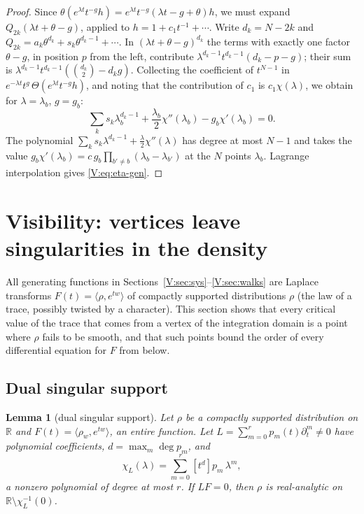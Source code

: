 \documentclass[11pt,a4paper]{article}
\newtheorem{lemma}[theorem]{Lemma}
\theoremstyle{definition}
\theoremstyle{remark}
\newcommand{\R}{\mathbb R}
\numberwithin{equation}{section}
\begin{document}
\begin{proof}
Since $\theta(e^{\lambda t}t^{-g}h)=e^{\lambda t}t^{-g}(\lambda t-g+\theta)h$, we must expand $Q_{2k}(\lambda t+\theta-g)$, applied to $h=1+c_1t^{-1}+\cdots$. Write $d_k=N-2k$ and $Q_{2k}=a_k\theta^{d_k}+s_k\theta^{d_k-1}+\cdots$. In $(\lambda t+\theta-g)^{d_k}$ the terms with exactly one factor $\theta-g$, in position $p$ from the left, contribute $\lambda^{d_k-1}t^{d_k-1}(d_k-p-g)$; their sum is $\lambda^{d_k-1}t^{d_k-1}(\binom{d_k}2-d_kg)$. Collecting the coefficient of $t^{N-1}$ in $e^{-\lambda t}t^{g}\,\Theta(e^{\lambda t}t^{-g}h)$, and noting that the contribution of $c_1$ is $c_1\chi(\lambda)$, we obtain for $\lambda=\lambda_b$, $g=g_b$:
\[
\sum_ks_k\lambda_b^{d_k-1}+\frac{\lambda_b}2\chi''(\lambda_b)-g_b\chi'(\lambda_b)=0 .
\]
The polynomial $\sum_ks_k\lambda^{d_k-1}+\frac\lambda2\chi''(\lambda)$ has degree at most $N-1$ and takes the value $g_b\chi'(\lambda_b)=c\,g_b\prod_{b'\ne b}(\lambda_b-\lambda_{b'})$ at the $N$ points $\lambda_b$. Lagrange interpolation gives \eqref{V:eq:eta-gen}.
\end{proof}
\section{Visibility: vertices leave singularities in the density}\label{V:sec:vis}

All generating functions in Sections~\ref{V:sec:sys}--\ref{V:sec:walks} are Laplace transforms $F(t)=\langle\rho,e^{tw}\rangle$ of compactly supported distributions $\rho$ (the law of a trace, possibly twisted by a character). This section shows that every critical value of the trace that comes from a vertex of the integration domain is a point where $\rho$ fails to be smooth, and that such points bound the order of every differential equation for $F$ from below.

\subsection{Dual singular support}

\begin{lemma}[dual singular support]\label{V:lem:dual}
Let $\rho$ be a compactly supported distribution on $\R$ and $F(t)=\langle\rho_w,e^{tw}\rangle$, an entire function. Let $L=\sum_{m=0}^{r}p_m(t)\partial_t^m\ne0$ have polynomial coefficients, $d=\max_m\deg p_m$, and
\[
\chi_L(\lambda)=\sum_{m=0}^{r}[t^d]p_m\,\lambda^m ,
\]
a nonzero polynomial of degree at most $r$. If $LF=0$, then $\rho$ is real-analytic on $\R\setminus\chi_L^{-1}(0)$.
\end{lemma}
\end{document}
